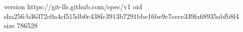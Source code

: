 version https://git-lfs.github.com/spec/v1
oid sha256:b36372c0a4cf515db0c438fc3913b7291bbe16be9c7cece339fa68935abfb8f4
size 786528
